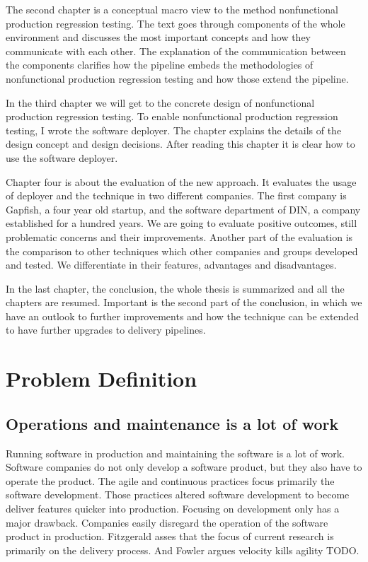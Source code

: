 The second chapter is a conceptual macro view to the method nonfunctional production
regression testing. The text goes through components of the whole environment and
discusses the most important concepts and how they communicate with each other. The
explanation of the communication between the components clarifies how the pipeline embeds
the methodologies of nonfunctional production regression testing and how those extend the
pipeline.

In the third chapter we will get to the concrete design of nonfunctional production
regression testing. To enable nonfunctional production regression testing, I wrote the
software deployer.  The chapter explains the details of the design concept and design
decisions. After reading this chapter it is clear how to use the software deployer.

Chapter four is about the evaluation of the new approach. It evaluates the usage of
deployer and the technique in two different companies. The first company is Gapfish, a
four year old startup, and the software department of DIN, a company established for a
hundred years. We are going to evaluate positive outcomes, still problematic concerns and
their improvements. Another part of the evaluation is the comparison to other techniques
which other companies and groups developed and tested. We differentiate in their features,
advantages and disadvantages.

In the last chapter, the conclusion, the whole thesis is summarized and all the chapters
are resumed. Important is the second part of the conclusion, in which we have an outlook
to further improvements and how the technique can be extended to have further upgrades to
delivery pipelines.

\chapter{Problem Definition}

\section{Operations and maintenance is a lot of work}

Running software in production and maintaining the software is a lot of work. Software
companies do not only develop a software product, but they also have to operate the
product. The agile and continuous practices focus primarily the software
development. Those practices altered software development to become deliver features
quicker into production. Focusing on development only has a major drawback. Companies
easily disregard the operation of the software product in production. Fitzgerald asses
that the focus of current research is primarily on the delivery process. And Fowler
argues velocity kills agility TODO.

